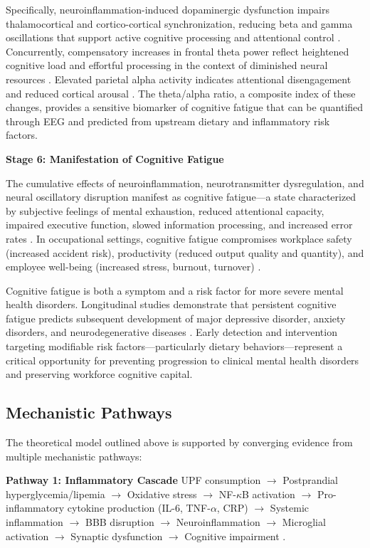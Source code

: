 \documentclass[journal,twoside,10pt]{IEEEtran}
\begin{document}
Specifically, neuroinflammation-induced dopaminergic dysfunction impairs thalamocortical and cortico-cortical synchronization, reducing beta and gamma oscillations that support active cognitive processing and attentional control \cite{ref3,ref17}. Concurrently, compensatory increases in frontal theta power reflect heightened cognitive load and effortful processing in the context of diminished neural resources \cite{ref1,ref4,ref10}. Elevated parietal alpha activity indicates attentional disengagement and reduced cortical arousal \cite{ref1,ref4,ref18}. The theta/alpha ratio, a composite index of these changes, provides a sensitive biomarker of cognitive fatigue that can be quantified through EEG and predicted from upstream dietary and inflammatory risk factors.

\textbf{Stage 6: Manifestation of Cognitive Fatigue}

The cumulative effects of neuroinflammation, neurotransmitter dysregulation, and neural oscillatory disruption manifest as cognitive fatigue---a state characterized by subjective feelings of mental exhaustion, reduced attentional capacity, impaired executive function, slowed information processing, and increased error rates \cite{ref1,ref4,ref18,ref28}. In occupational settings, cognitive fatigue compromises workplace safety (increased accident risk), productivity (reduced output quality and quantity), and employee well-being (increased stress, burnout, turnover) \cite{ref21,ref25,ref29}.

Cognitive fatigue is both a symptom and a risk factor for more severe mental health disorders. Longitudinal studies demonstrate that persistent cognitive fatigue predicts subsequent development of major depressive disorder, anxiety disorders, and neurodegenerative diseases \cite{ref1,ref8,ref29}. Early detection and intervention targeting modifiable risk factors---particularly dietary behaviors---represent a critical opportunity for preventing progression to clinical mental health disorders and preserving workforce cognitive capital.

\subsection{Mechanistic Pathways}

The theoretical model outlined above is supported by converging evidence from multiple mechanistic pathways:

\textbf{Pathway 1: Inflammatory Cascade}
UPF consumption $\rightarrow$ Postprandial hyperglycemia/lipemia $\rightarrow$ Oxidative stress $\rightarrow$ NF-$\kappa$B activation $\rightarrow$ Pro-inflammatory cytokine production (IL-6, TNF-$\alpha$, CRP) $\rightarrow$ Systemic inflammation $\rightarrow$ BBB disruption $\rightarrow$ Neuroinflammation $\rightarrow$ Microglial activation $\rightarrow$ Synaptic dysfunction $\rightarrow$ Cognitive impairment \cite{ref3,ref5,ref11,ref13,ref17,ref42}.
\end{document}
